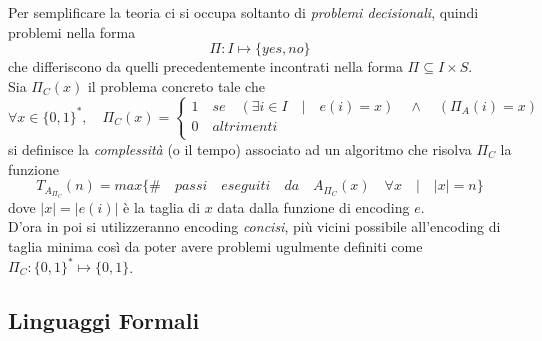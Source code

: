 \documentclass[a4paper,portrait,12pt]{article}
\theoremstyle{definition}
\begin{document}
Per semplificare la teoria ci si occupa soltanto di \textit{problemi decisionali}, quindi problemi nella forma
\begin{equation}
\Pi : I \mapsto \{yes,no\}
\end{equation}
che differiscono da quelli precedentemente incontrati nella forma $\Pi \subseteq I \times S$.\\ 
Sia $\Pi_C (x)$ il problema concreto tale che
\begin{equation}
\forall x \in \{0,1\}^*,\quad \Pi_C (x) = 
	\left\{
		\begin{array}{ll}
			1 \quad se\quad (\exists i \in I\quad |\quad e(i) = x)\quad\wedge\quad(\Pi_A (i) = x)\\
			0 \quad altrimenti\\
		\end{array}
	\right.
\end{equation}
si definisce la \textit{complessità} (o il tempo) associato ad un algoritmo che risolva $\Pi_C$ la funzione
\begin{equation}
T_{A_{\Pi_C}} (n) = max\{\# \quad passi\quad eseguiti\quad da\quad A_{\Pi_C} (x) \quad\forall x \quad | \quad 
\left|x\right| = n \}
\end{equation}
dove $\left|x\right| = \left|e(i)\right|$ è la taglia di $x$ data dalla funzione di encoding $e$.\\
D'ora in poi si utilizzeranno encoding \textit{concisi}, più vicini possibile all'encoding di taglia minima così da
poter avere problemi ugulmente definiti come $\Pi_C : \{0,1\}^* \mapsto \{0,1\}$.\\


\subsection{Linguaggi Formali} 
\end{document}
